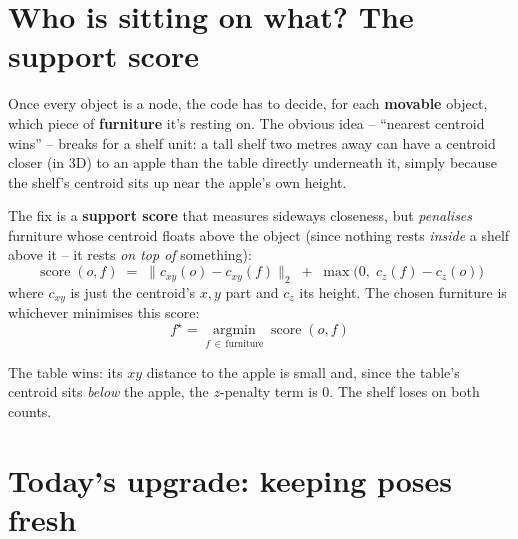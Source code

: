 \documentclass[11pt]{article}
\begin{document}
\section{Who is sitting on what? The support score}

Once every object is a node, the code has to decide, for each
\textbf{movable} object, which piece of \textbf{furniture} it's resting on.
The obvious idea -- ``nearest centroid wins'' -- breaks for a shelf unit:
a tall shelf two metres away can have a centroid closer (in 3D) to an apple
than the table directly underneath it, simply because the shelf's centroid
sits up near the apple's own height.

The fix is a \textbf{support score} that measures sideways closeness, but
\emph{penalises} furniture whose centroid floats above the object (since
nothing rests \emph{inside} a shelf above it -- it rests \emph{on top of}
something):
\[
\operatorname{score}(o, f) \;=\; \big\| c_{xy}(o) - c_{xy}(f) \big\|_2 \;+\; \max\!\big(0,\; c_z(f) - c_z(o)\big)
\]
where $c_{xy}$ is just the centroid's $x,y$ part and $c_z$ its height. The
chosen furniture is whichever minimises this score:
\[
f^{\star} = \operatorname*{argmin}_{f \,\in\, \text{furniture}} \operatorname{score}(o, f)
\]

\begin{center}
\end{center}

The table wins: its $xy$ distance to the apple is small and, since the
table's centroid sits \emph{below} the apple, the $z$-penalty term is $0$.
The shelf loses on both counts.

\section{Today's upgrade: keeping poses fresh}
\end{document}
